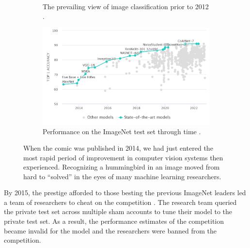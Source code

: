 \begin{figure}
\begin{subfigure}[b]{0.23\textwidth}
         \caption{The prevailing view of image classification prior to 2012 \cite{munroe_tasks_2014}.}
         \label{fig:xkcd}
     \end{subfigure}
     \begin{subfigure}[b]{0.76\textwidth}
         \centering
         \includegraphics[width=\textwidth]{images/imagenet_benchmarks.png}
         \caption{Performance on the ImageNet test set through time \cite{robert_stojnic_papers_2022}.}
         \label{fig:imagenetbenchmarks}
     \end{subfigure}
     \caption{When the comic was published in 2014, we had just entered the most rapid period of improvement in computer vision systems then experienced. Recognizing a hummingbird in an image moved from hard to ``solved'' in the eyes of many machine learning researchers.}
     \label{fig:imagenet}
\end{figure}

By 2015, the prestige afforded to those besting the previous ImageNet leaders led a team of researchers to cheat on the competition \cite{simonite_why_2015}. The research team queried the private test set across multiple sham accounts to tune their model to the private test set. As a result, the performance estimates of the competition became invalid for the model and the researchers were banned from the competition.

